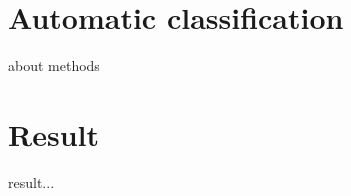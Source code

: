 \section{Automatic classification }
about methods
\section{Result}
result...





























